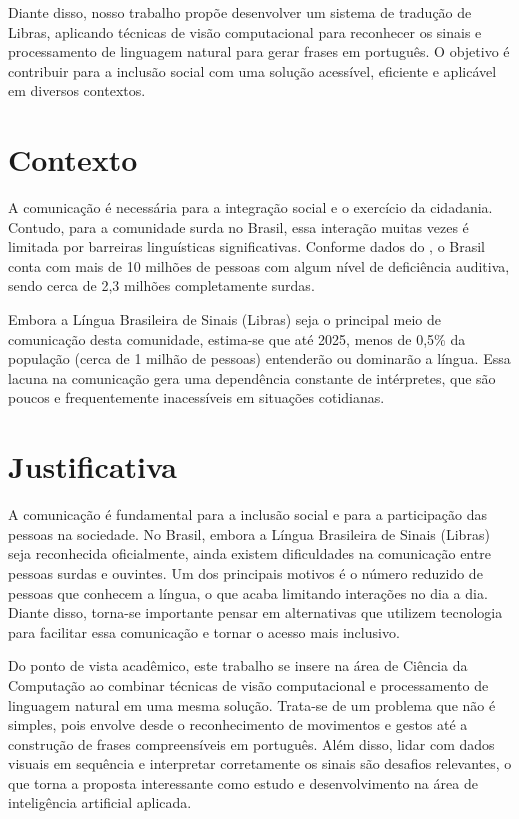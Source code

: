 \documentclass[
    12pt,                %
    openright,           %
    oneside,             %
    a4paper,             %
    english,             %
    brazil               %
]{abntex2}
\begin{document}
Diante disso, nosso trabalho propõe desenvolver um sistema de tradução de Libras, aplicando técnicas de visão computacional para reconhecer os sinais e processamento de linguagem natural para gerar frases em português. O objetivo é contribuir para a inclusão social com uma solução acessível, eficiente e aplicável em diversos contextos. 

\section{Contexto}
\label{sec:contexto}

A comunicação é necessária para a integração social e o exercício da cidadania. Contudo, para a comunidade surda no Brasil, essa interação muitas vezes é limitada por barreiras linguísticas significativas. Conforme dados do \cite{IBGE2019}, o Brasil conta com mais de 10 milhões de pessoas com algum nível de deficiência auditiva, sendo cerca de 2,3 milhões completamente surdas. 

Embora a Língua Brasileira de Sinais (Libras) seja o principal meio de comunicação desta comunidade, estima-se que até 2025, menos de 0,5\% da população (cerca de 1 milhão de pessoas) entenderão ou dominarão a língua. Essa lacuna na comunicação gera uma dependência constante de intérpretes, que são poucos e frequentemente inacessíveis em situações cotidianas. 

\section{Justificativa}
\label{sec:justificativa}

A comunicação é fundamental para a inclusão social e para a participação das pessoas na sociedade. No Brasil, embora a Língua Brasileira de Sinais (Libras) seja reconhecida oficialmente, ainda existem dificuldades na comunicação entre pessoas surdas e ouvintes. Um dos principais motivos é o número reduzido de pessoas que conhecem a língua, o que acaba limitando interações no dia a dia. Diante disso, torna-se importante pensar em alternativas que utilizem tecnologia para facilitar essa comunicação e tornar o acesso mais inclusivo.

Do ponto de vista acadêmico, este trabalho se insere na área de Ciência da Computação ao combinar técnicas de visão computacional e processamento de linguagem natural em uma mesma solução. Trata-se de um problema que não é simples, pois envolve desde o reconhecimento de movimentos e gestos até a construção de frases compreensíveis em português. Além disso, lidar com dados visuais em sequência e interpretar corretamente os sinais são desafios relevantes, o que torna a proposta interessante como estudo e desenvolvimento na área de inteligência artificial aplicada.
\end{document}
